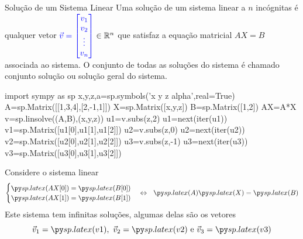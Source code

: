 \begin{frame}[label=sistemas]{Solução de um Sistema Linear}
Uma {\color{blue} solução} de um sistema linear a $n$ incógnitas é qualquer vetor
\({\color{blue}\vec{v}=\begin{bmatrix} v_1\\ v_2\\ \vdots\\ v_n \end{bmatrix}}\in \mathbb{R}^n\)
que satisfaz a equação matricial $AX=B$ associada ao sistema. O conjunto de todas as soluções do sistema é chamado {\color{blue} conjunto solução} ou {\color{blue} solução geral} do sistema.
\end{frame}

\begin{frame}[label=sistemas,fragile]
\begin{pycode}
import sympy as sp
x,y,z,a=sp.symbols('x y z alpha',real=True)
A=sp.Matrix([[1,3,4],[2,-1,1]])
X=sp.Matrix([x,y,z])
B=sp.Matrix([1,2])
AX=A*X
v=sp.linsolve((A,B),(x,y,z))
u1=v.subs(z,2)
u1=next(iter(u1))
v1=sp.Matrix([u1[0],u1[1],u1[2]])
u2=v.subs(z,0)
u2=next(iter(u2))
v2=sp.Matrix([u2[0],u2[1],u2[2]])
u3=v.subs(z,-1)
u3=next(iter(u3))
v3=sp.Matrix([u3[0],u3[1],u3[2]])
\end{pycode}
\begin{exe}
Considere o sistema linear 
\[\begin{cases}
\pyl{AX[0]}=\pyl{B[0]}\\
\pyl{AX[1]}=\pyl{B[1]}
\end{cases} 
\Leftrightarrow \ \
\pyl{A}\pyl{X}=\pyl{B}
\]
Este sistema tem infinitas soluções, algumas delas são os  vetores
\[
\vec{v}_1=\pyl{v1},\ \vec{v}_2=\pyl{v2} \text{ e }  \vec{v}_3=\pyl{v3}
\]
\end{exe}
\end{frame}


